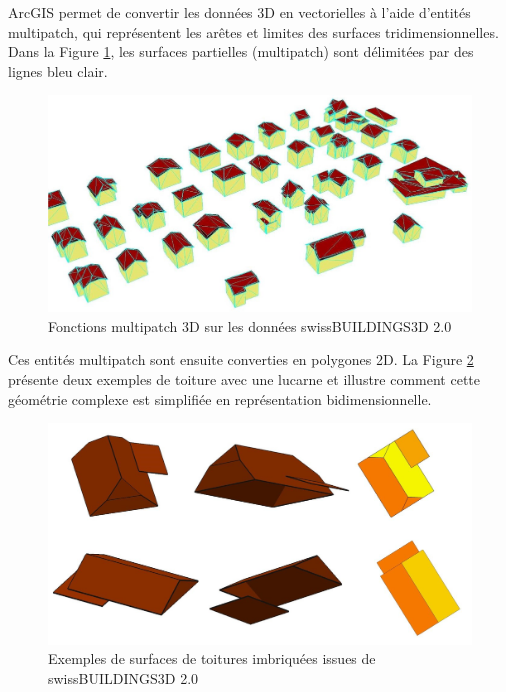 ArcGIS permet de convertir les données 3D en vectorielles à l'aide d'entités multipatch, qui représentent les arêtes et limites des surfaces tridimensionnelles. Dans la Figure \ref{fig:ch2_montoitsolaire_04_3d_vectoriel2}, les surfaces partielles (multipatch) sont délimitées par des lignes bleu clair.

\begin{figure}[H]
    \centering
    \includegraphics[width=1\linewidth]{02-main//figures/ch2/ch2_montoitsolaire_04_3d_vectoriel2.png}
    \caption{Fonctions multipatch 3D sur les données swissBUILDINGS3D 2.0 \cite{bfe_wie_nodate}}
    \label{fig:ch2_montoitsolaire_04_3d_vectoriel2}
\end{figure}

Ces entités multipatch sont ensuite converties en polygones 2D. La Figure \ref{fig:ch2_montoitsolaire_05_3d_vectoriel3} présente deux exemples de toiture avec une lucarne et illustre comment cette géométrie complexe est simplifiée en représentation bidimensionnelle.

\begin{figure}[H]
    \centering
    \includegraphics[width=\textwidth]{02-main/figures/ch2/ch2_montoitsolaire_05_3d_vectoriel3.png}
    \caption{Exemples de surfaces de toitures imbriquées issues de swissBUILDINGS3D 2.0 \cite{bfe_wie_nodate}}
    \label{fig:ch2_montoitsolaire_05_3d_vectoriel3}
\end{figure}


